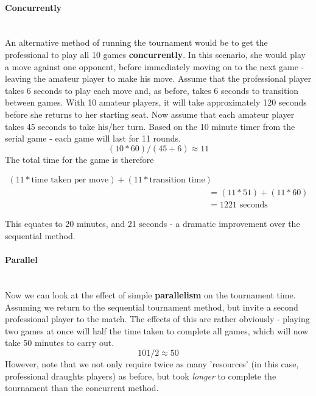 \paragraph{Concurrently} \mbox{}\\

An alternative method of running the tournament would be to get the professional
to play all 10 games \textbf{concurrently}. In this scenario, she would play
a move against one opponent, before immediately moving on to the next game -
leaving the amateur player to make his move. Assume that the professional player
takes 6 seconds to play each move and, as before, takes 6 seconds to transition
between games. With 10 amateur players, it will take approximately 120 seconds
before she returns to her starting seat. Now assume that each amateur player
takes 45 seconds to take his/her turn. Based on the 10 minute timer from the
serial game - each game will last for 11 rounds.
$$(10 * 60) / (45 + 6) \approx 11$$
The total time for the game is therefore

\begin{equation}
  \begin{split}
    (11 * \text{time taken per move}) + (11 * \text{transition time}) \\
    &= (11 * 51) + (11 * 60) \\
    &= 1221 \text{ seconds}
  \end{split}
\end{equation}

This equates to 20 minutes, and 21 seconds - a dramatic improvement over the
sequential method. \\

\paragraph{Parallel} \mbox{}\\

Now we can look at the effect of simple \textbf{parallelism} on the tournament
time. Assuming we return to the sequential tournament method, but invite a
second professional player to the match. The effects of this are rather
obviously - playing two games at once will half the time taken to complete all
games, which will now take 50 minutes to carry out. $$101/2 \approx 50$$
However, note that we not only require twice as many 'resources' (in this case,
professional draughts players) as before, but took \emph{longer} to complete the
tournament than the concurrent method. \\


